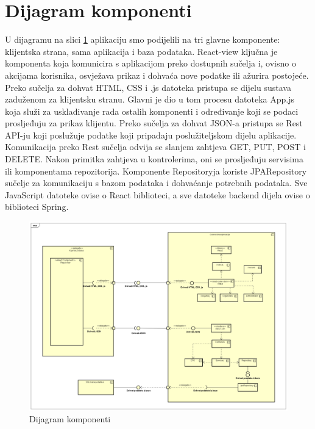 			\eject
			
			
		\section{Dijagram komponenti}
		
			U dijagramu na slici \ref{comd} aplikaciju smo podijelili na tri glavne komponente: klijentska strana, sama aplikacija i baza podataka. React-view ključna je komponenta koja  komunicira s aplikacijom preko dostupnih sučelja i, ovisno o akcijama korisnika, osvježava prikaz i dohvaća nove podatke ili ažurira postojeće. Preko sučelja za dohvat HTML, CSS i .js datoteka pristupa se dijelu sustava zaduženom za klijentsku stranu. Glavni je dio u tom procesu datoteka App.js koja služi za usklađivanje rada ostalih komponenti i određivanje koji se podaci prosljeđuju za prikaz klijentu. Preko sučelja za dohvat JSON-a pristupa se Rest API-ju koji poslužuje podatke koji pripadaju poslužiteljskom dijelu aplikacije. Komunikacija preko Rest sučelja odvija se slanjem zahtjeva GET, PUT, POST i DELETE. Nakon primitka zahtjeva u kontrolerima, oni se prosljeđuju servisima ili komponentama repozitorija. Komponente Repositoryja koriste JPARepository sučelje za komunikaciju s bazom podataka i dohvaćanje potrebnih podataka. Sve JavaScript datoteke ovise o React biblioteci, a sve datoteke backend dijela ovise o biblioteci Spring.
		
		
			\begin{figure}[H]
				\includegraphics[width=\textwidth]{dijagrami/comd.png} 
				\centering
				\vspace{-0.2cm}
				\caption{Dijagram komponenti}
				\label{comd}
			\end{figure}
			